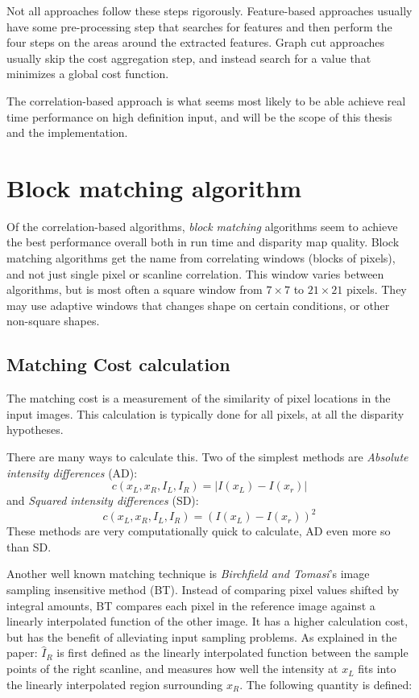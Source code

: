 Not all approaches follow these steps rigorously. Feature-based
approaches usually have some pre-processing step that searches for
features and then perform the four steps on the areas around the
extracted features. Graph cut approaches usually skip the cost
aggregation step, and instead search for a value that minimizes a
global cost function.

The correlation-based approach is what seems most likely to be able
achieve real time performance on high definition input, and will be
the scope of this thesis and the implementation.

\section{Block matching algorithm}

Of the correlation-based algorithms, \textit{block matching}
algorithms seem to achieve the best performance overall both in run
time and disparity map quality\cite{taxonomy}. Block matching
algorithms get the name from correlating windows (blocks of pixels),
and not just single pixel or scanline correlation. This window varies
between algorithms, but is most often a square window from $7\times7$
to $21\times21$ pixels. They may use adaptive windows that changes
shape on certain conditions, or other non-square shapes.



\subsection{Matching Cost calculation}
\label{sec:matchingcost}

The matching cost is a measurement of the similarity of pixel
locations in the input images. This calculation is typically done for
all pixels, at all the disparity hypotheses.

There are many ways to calculate this. Two of the simplest methods are
\textit{Absolute intensity differences} (AD):
\begin{equation}
  c(x_L,x_R,I_L,I_R) = | I(x_L) - I(x_r) |
\end{equation}
and \textit{Squared intensity differences} (SD):
\begin{equation}
  c(x_L,x_R,I_L,I_R) = (I(x_L) - I(x_r))^2 
\end{equation}
These methods are very computationally quick to calculate, AD even
more so than SD.

Another well known matching technique is \textit{Birchfield and
  Tomasi}'s image sampling insensitive method (BT)\cite{bt}. Instead
of comparing pixel values shifted by integral amounts, BT compares
each pixel in the reference image against a linearly interpolated
function of the other image. It has a higher calculation cost, but has
the benefit of alleviating input sampling problems. As explained in
the paper: $\hat{I}_R$ is first defined as the linearly interpolated
function between the sample points of the right scanline, and measures
how well the intensity at $x_L$ fits into the linearly interpolated
region surrounding $x_R$. The following quantity is defined:

